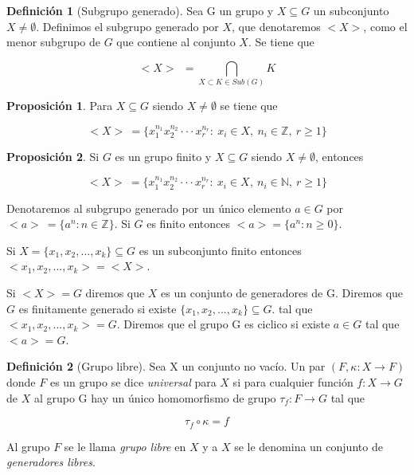 \documentclass[12pt]{article}
\theoremstyle{definition}
\newtheorem{defi}{Definición}[section]
\newtheorem{prop}{Proposición}[section]
\begin{document}
\begin{defi}[Subgrupo generado]
Sea G un grupo y $X\subseteq G$ un subconjunto $X\neq\emptyset$. Definimos el subgrupo generado por $X$, que denotaremos $<X>$, como el menor subgrupo de $G$ que contiene al conjunto $X$. Se tiene que

$$<X>\ \ =\bigcap_{X\subset K\in Sub(G)}K$$

\end{defi}

\begin{prop}
Para $X\subseteq G$ siendo $X\neq\emptyset$ se tiene que

$$<X>\  = \{x_1^{n_1}x_2^{n_2}\cdot\cdot\cdot x_r^{n_r} :\ x_i\in X,\ n_i\in\mathbb{Z},\ r\geq 1\}$$

\end{prop}

\begin{prop}
Si $G$ es un grupo finito y $X\subseteq G$ siendo $X\neq\emptyset$, entonces

$$<X>\  = \{x_1^{n_1}x_2^{n_2}\cdot\cdot\cdot x_r^{n_r} :\ x_i\in X,\ n_i\in\mathbb{N},\ r\geq 1\}$$

\end{prop}

Denotaremos al subgrupo generado por un único elemento $a\in G$ por $<a>\ = \{a^n:n\in\mathbb{Z}\}$. Si $G$ es finito entonces $<a> = \{a^n:n\geq 0\}$.

Si $X=\{x_1,x_2,...,x_k\}\subseteq G$ es un subconjunto finito entonces $<x_1,x_2,...,x_k>=<X>$.

Si $<X> = G$ diremos que $X$ es un conjunto de generadores de G. Diremos que $G$ es finitamente generado si existe $\{x_1,x_2,...,x_k\}\subseteq G.$ tal que $<x_1,x_2,...,x_k>=G$. Diremos que el grupo G es ciclico si existe $a\in G$ tal que $<a>=G$.



\begin{defi}[Grupo libre]
Sea X un conjunto no vacío. Un par $(F,\kappa:X\rightarrow F)$ donde $F$ es un grupo se dice \textit{universal} para $X$ si para cualquier función $f:X\rightarrow G$ de $X$ al grupo G hay un único homomorfismo de grupo $\tau_f:F\rightarrow G$ tal que

$$\tau_f\circ\kappa = f$$

Al grupo $F$ se le llama \textit{grupo libre} en $X$ y a $X$ se le denomina un conjunto de \textit{generadores libres}.

\end{defi}
\end{document}
